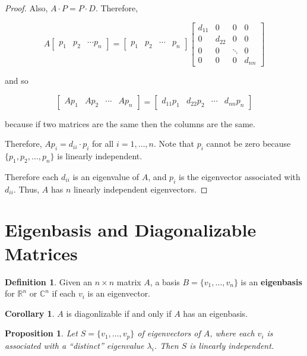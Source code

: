 \documentclass[12pt]{article}
\newtheorem*{proposition}{Proposition}
\theoremstyle{definition}
\newtheorem*{definition}{Definition}
\newtheorem*{corollary}{Corollary}
\begin{document}
\begin{proof}
Also, $A \cdot P = P \cdot D$. Therefore,

\[ A \begin{bmatrix} p_1 & p_2 & \cdots p_n \end{bmatrix} =
\begin{bmatrix} p_1 & p_2 & \cdots & p_n \end{bmatrix} 
\begin{bmatrix}
d_{11} & 0 & 0 & 0\\
0 & d_{22} & 0 & 0\\
0 & 0 & \ddots & 0 \\
0& 0 & 0 & d_{nn}
\end{bmatrix} 
\]

and so

\[
\begin{bmatrix} Ap_1 & Ap_2 & \cdots & Ap_n \end{bmatrix} = 
\begin{bmatrix} d_{11}p_1 & d_{22}p_2 & \cdots & d_{nn}p_n \end{bmatrix}
\]

because if two matrices are the same then the columns are the same.

Therefore, $Ap_i = d_{ii} \cdot p_i$ for all $i = 1, \ldots, n$. Note that
$p_i$ cannot be zero because $\{p_1, p_2, \dots, p_n\}$ is linearly independent.

Therefore each $d_{ii}$ is an eigenvalue of $A$, and $p_i$ is the eigenvector associated
with $d_{ii}$. Thus, $A$ has $n$ linearly independent eigenvectors.
\end{proof}

\section{Eigenbasis and Diagonalizable Matrices}

\begin{definition}
Given an $n \times n$ matrix $A$, a basis $B = \{v_1, \ldots, v_n\}$ is an
\textbf{eigenbasis} for $\mathbb{R}^n$ or $\mathbb{C}^n$ if each $v_i$ is an
eigenvector.
\end{definition}

\begin{corollary}
$A$ is diagonlizable if and only if $A$ has an eigenbasis.
\end{corollary}

\begin{proposition}
Let $S = \{v_1, \ldots, v_p\}$ of eigenvectors of $A$, where each $v_i$ is associated
with a ``distinct'' eigenvalue $\lambda_i$. Then $S$ is linearly independent.
\end{proposition}
\end{document}
